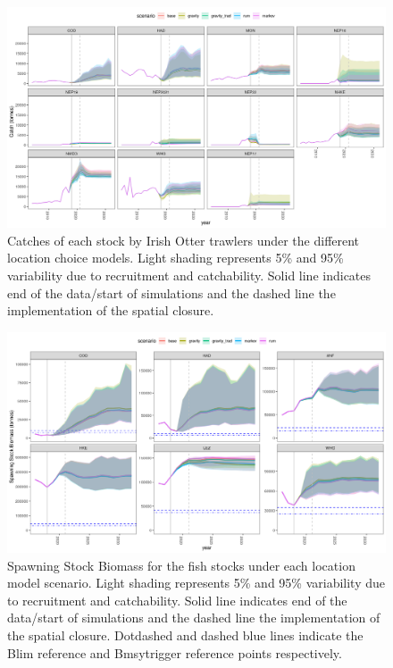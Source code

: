 \documentclass[12pt, halfline, a4paper]{ouparticle}
\begin{document}
\begin{figure}[!ht]
	\centering
	\includegraphics[width=1\linewidth]{figures/IE_Otter_catches}
	\caption{Catches of each stock by Irish Otter trawlers under the
		different location choice models. Light shading represents 5\%
		and 95\% variability due to recruitment and catchability. Solid
		line indicates end of the data/start of simulations and the
		dashed line the implementation of the spatial closure.} 
	\label{fig:OtterC}
\end{figure}	

\begin{figure}[!ht]
	\centering
	\includegraphics[width=1\linewidth]{figures/SSB_difference}
	\caption{Spawning Stock Biomass for the fish stocks under each location
		model scenario. Light shading represents 5\% and 95\%
		variability due to recruitment and catchability. Solid line
		indicates end of the data/start of simulations and the dashed
		line the implementation of the spatial closure.  Dotdashed and
		dashed blue lines indicate the Blim reference and Bmsytrigger
		reference points respectively.} 
	\label{fig:SSB}
\end{figure}	
\end{document}
